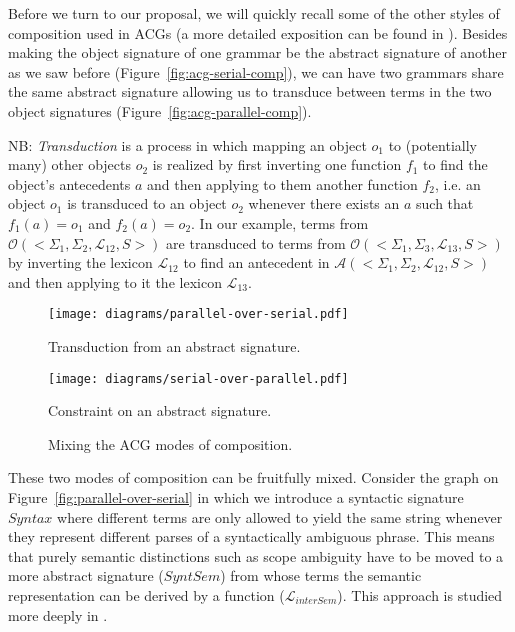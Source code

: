Before we turn to our proposal, we will quickly recall some of the other
styles of composition used in ACGs (a more detailed exposition can be
found in \cite{pogodalla2012controlling}). Besides making the object
signature of one grammar be the abstract signature of another as we saw
before (Figure~\ref{fig:acg-serial-comp}), we can have two grammars
share the same abstract signature allowing us to transduce between terms
in the two object signatures (Figure~\ref{fig:acg-parallel-comp}).

NB: \emph{Transduction} is a process in which mapping an object $o_1$ to
(potentially many) other objects $o_2$ is realized by first inverting
one function $f_1$ to find the object's antecedents $a$ and then
applying to them another function $f_2$, i.e. an object $o_1$ is
transduced to an object $o_2$ whenever there exists an $a$ such that
$f_1(a) = o_1$ and $f_2(a) = o_2$. In our example, terms from
$\mathcal{O}( \mathopen{<} \Sigma_1, \Sigma_2, \mathcal{L}_{12}, S
\mathclose{>} )$ are transduced to terms from $\mathcal{O}( \mathopen{<}
\Sigma_1, \Sigma_3, \mathcal{L}_{13}, S \mathclose{>} )$ by inverting
the lexicon $\mathcal{L}_{12}$ to find an antecedent in $\mathcal{A}(
\mathopen{<} \Sigma_1, \Sigma_2, \mathcal{L}_{12}, S \mathclose{>} )$
and then applying to it the lexicon $\mathcal{L}_{13}$.

\begin{figure}[t]
  \centering
  \begin{minipage}[b]{0.4\textwidth}
    \centering
    \texttt{[image: diagrams/parallel-over-serial.pdf]}
    \caption{\label{fig:parallel-over-serial} Transduction from an
      abstract signature.}
  \end{minipage}
  \qquad
  \begin{minipage}[b]{0.4\textwidth}
    \centering
    \texttt{[image: diagrams/serial-over-parallel.pdf]}
    \caption{\label{fig:serial-over-parallel} Constraint on an abstract
      signature.}
  \end{minipage}
  \caption{\label{fig:acg-comp-patterns} Mixing the ACG modes of
    composition.}
\end{figure}

These two modes of composition can be fruitfully mixed. Consider the
graph on Figure~\ref{fig:parallel-over-serial} in which we introduce a
syntactic signature $Syntax$ where different terms are only allowed to
yield the same string whenever they represent different parses of a
syntactically ambiguous phrase. This means that purely semantic
distinctions such as scope ambiguity have to be moved to a more abstract
signature ($SyntSem$) from whose terms the semantic representation can
be derived by a function ($\mathcal{L}_{interSem}$). This approach is
studied more deeply in \cite{pogodalla2007generalizing}.

